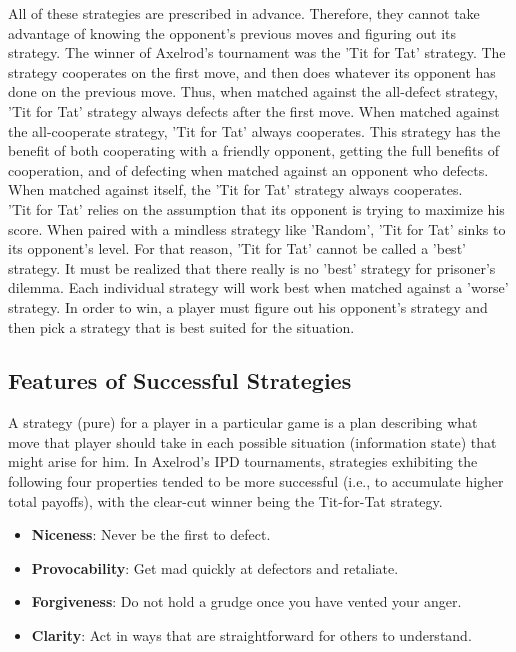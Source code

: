 \documentclass[a4paper]{article}
\begin{document}
	All of these strategies are prescribed in advance. Therefore, they cannot take advantage of knowing the opponent's previous moves and figuring out its strategy. The winner of Axelrod's tournament was the 'Tit for Tat' strategy. The strategy cooperates on the first move, and then does whatever its opponent has done on the previous move. Thus, when matched against the all-defect strategy, 'Tit for Tat' strategy always defects after the first move. When matched against the all-cooperate strategy, 'Tit for Tat' always cooperates. This strategy has the benefit of both cooperating with a friendly opponent, getting the full benefits of cooperation, and of defecting when matched against an opponent who defects. When matched against itself, the 'Tit for Tat' strategy always cooperates.\\
	'Tit for Tat' relies on the assumption that its opponent is trying to maximize his score. When paired with a mindless strategy like 'Random', 'Tit for Tat' sinks to its opponent's level. For that reason, 'Tit for Tat' cannot be called a 'best' strategy. It must be realized that there really is no 'best' strategy for prisoner's dilemma. Each individual strategy will work best when matched against a 'worse' strategy. In order to win, a player must figure out his opponent's strategy and then pick a strategy that is best suited for the situation.
	
	\subsection{Features of Successful Strategies}

A strategy (pure) for a player in a particular game is a plan describing what move that player should take in each possible situation (information state) that might arise for him.
In Axelrod’s IPD tournaments, strategies exhibiting the following four properties tended to be more successful (i.e., to accumulate higher total payoffs), with the clear-cut winner being the Tit-for-Tat strategy.
	\begin{itemize}
		\item \textbf{Niceness}: Never be the first to defect.
		\item \textbf{Provocability}: Get mad quickly at defectors and retaliate.
		\item \textbf{Forgiveness}: Do not hold a grudge once you have vented your anger.
		\item \textbf{Clarity}: Act in ways that are straightforward for others to understand.
	\end{itemize}
\end{document}
